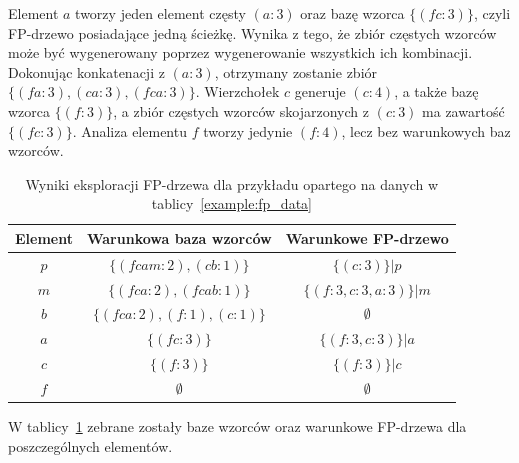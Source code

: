 Element $a$ tworzy jeden element częsty $(a:3)$ oraz bazę wzorca $\lbrace (fc:3) \rbrace$, czyli FP-drzewo posiadające jedną ścieżkę. Wynika z tego, że zbiór częstych wzorców może być wygenerowany poprzez wygenerowanie wszystkich ich kombinacji. Dokonując konkatenacji z $(a:3)$, otrzymany zostanie zbiór $\lbrace (fa:3), (ca:3), (fca:3) \rbrace$. Wierzchołek $c$ generuje $(c:4)$, a także bazę wzorca $\lbrace (f:3) \rbrace$, a zbiór częstych wzorców skojarzonych z $(c:3)$ ma zawartość $\lbrace (fc:3)\rbrace$. Analiza elementu $f$ tworzy jedynie $(f:4)$, lecz bez warunkowych baz wzorców.

\begin{table}
	\centering
	\begin{tabular}{|c|c|c|} \hline
	\textbf{Element} &  \textbf{Warunkowa baza wzorców} & \textbf{Warunkowe FP-drzewo} \\ \hline
	$p$ & $\lbrace ( fcam: 2 ), (cb: 1) \rbrace$ & $\lbrace (c:3) \rbrace | p$ \\ 
	$m$ & $\lbrace ( fca: 2 ), (fcab: 1) \rbrace$ & $\lbrace (f:3, c:3, a:3) \rbrace | m$ \\ 
	$b$ & $\lbrace ( fca: 2 ), (f: 1), (c: 1) \rbrace$ & $\emptyset$ \\ 
	$a$ & $\lbrace ( fc: 3 ) \rbrace$ & $\lbrace (f:3, c:3) \rbrace | a$ \\ 
	$c$ & $\lbrace ( f: 3 ) \rbrace$ & $\lbrace (f:3) \rbrace | c$ \\ 
	$f$ & $\emptyset$ & $\emptyset$ \\ \hline
	\end{tabular}
	\caption{Wyniki eksploracji FP-drzewa dla przykładu opartego na danych w tablicy~\ref{example:fp_data}\label{example:sum_patterns}}
\end{table}

W tablicy~\ref{example:sum_patterns} zebrane zostały baze wzorców oraz warunkowe FP-drzewa dla poszczególnych elementów.